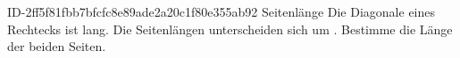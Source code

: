 \begin{exercise}
      {ID-2ff5f81fbb7bfcfc8e89ade2a20c1f80e355ab92}
      {Seitenlänge}
  \ifproblem\problem
    Die Diagonale eines Rechtecks ist  lang.
    Die Seitenlängen unterscheiden sich um .
    Bestimme die Länge der beiden Seiten.
  \fi
\end{exercise}

